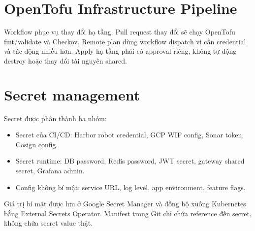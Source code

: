\section{OpenTofu Infrastructure Pipeline}

Workflow  phục vụ thay đổi hạ tầng. Pull request thay đổi  sẽ chạy OpenTofu fmt/validate và Checkov. Remote plan dùng workflow dispatch vì cần credential và tác động nhiều hơn. Apply hạ tầng phải có approval riêng, không tự động destroy hoặc thay đổi tài nguyên shared.

\section{Secret management}

Secret được phân thành ba nhóm:

\begin{itemize}
  \item Secret của CI/CD: Harbor robot credential, GCP WIF config, Sonar token, Cosign config.
  \item Secret runtime: DB password, Redis password, JWT secret, gateway shared secret, Grafana admin.
  \item Config không bí mật: service URL, log level, app environment, feature flags.
\end{itemize}

Giá trị bí mật được lưu ở Google Secret Manager và đồng bộ xuống Kubernetes bằng External Secrets Operator. Manifest trong Git chỉ chứa reference đến secret, không chứa secret value thật.
